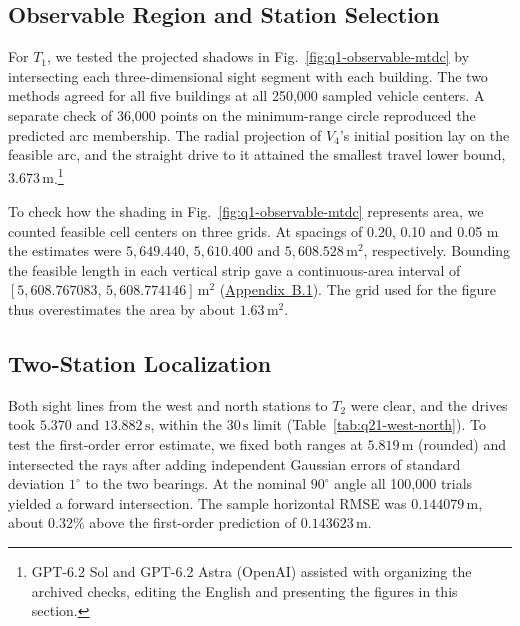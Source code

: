 \documentclass{swmcmthesis}
\begin{document}
\subsection{Observable Region and Station Selection}

For \(T_1\), we tested the projected shadows in Fig.~\ref{fig:q1-observable-mtdc} by intersecting each three-dimensional sight segment with each building. The two methods agreed for all five buildings at all 250,000 sampled vehicle centers. A separate check of 36,000 points on the minimum-range circle reproduced the predicted arc membership. The radial projection of \(V_4\)'s initial position lay on the feasible arc, and the straight drive to it attained the smallest travel lower bound, \(3.673\,\mathrm m\).\footnote{GPT-6.2 Sol and GPT-6.2 Astra (OpenAI) assisted with organizing the archived checks, editing the English and presenting the figures in this section.}

To check how the shading in Fig.~\ref{fig:q1-observable-mtdc} represents area, we counted feasible cell centers on three grids. At spacings of 0.20, 0.10 and 0.05 m the estimates were \(5{,}649.440\), \(5{,}610.400\) and \(5{,}608.528\,\mathrm{m^2}\), respectively. Bounding the feasible length in each vertical strip gave a continuous-area interval of \([5{,}608.767083,\,5{,}608.774146]\,\mathrm{m^2}\) (\hyperref[app:q1-alternatives]{Appendix~B.1}). The grid used for the figure thus overestimates the area by about \(1.63\,\mathrm{m^2}\).

\subsection{Two-Station Localization}

Both sight lines from the west and north stations to \(T_2\) were clear, and the drives took \(5.370\) and \(13.882\,\mathrm s\), within the \(30\,\mathrm s\) limit (Table~\ref{tab:q21-west-north}). To test the first-order error estimate, we fixed both ranges at \(5.819\,\mathrm m\) (rounded) and intersected the rays after adding independent Gaussian errors of standard deviation \(1^\circ\) to the two bearings. At the nominal \(90^\circ\) angle all 100,000 trials yielded a forward intersection. The sample horizontal RMSE was \(0.144079\,\mathrm m\), about \(0.32\%\) above the first-order prediction of \(0.143623\,\mathrm m\).
\end{document}
